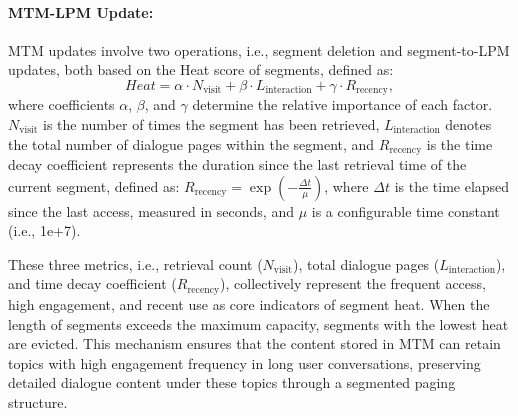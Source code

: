 \documentclass[11pt]{article}
\begin{document}


\paragraph{MTM-LPM Update:}
MTM updates involve two operations, i.e., segment deletion and segment-to-LPM updates, both based on the Heat score of segments, defined as:
\begin{equation}
        Heat = \alpha \cdot N_{\text{visit}} + \beta \cdot L_{\text{interaction}} + \gamma \cdot R_{\text{recency}},
       \label{eq:heat_formula}
\end{equation}
where coefficients $\alpha$, $\beta$, and $\gamma$ determine the relative importance of each factor. $N_{\text{visit}}$ is the number of times the segment has been retrieved, $L_{\text{interaction}}$ denotes the total number of dialogue pages within the segment, and $R_{\text{recency}}$ is the time decay coefficient represents the duration since the last retrieval time of the current segment, defined as:
$R_{\text{recency}} = \exp \left(-\frac{\Delta t}{\mu}\right)$,
where $\Delta t$ is the time elapsed since the last access, measured in seconds, and $\mu$ is a configurable time constant (i.e., 1e+7). 
    

These three metrics, i.e., retrieval count ($N_{\text{visit}}$), total dialogue pages ($L_{\text{interaction}}$), and time decay coefficient ($R_{\text{recency}}$), collectively represent the frequent access, high engagement, and recent use as core indicators of segment heat.
When the length of segments exceeds the maximum capacity, segments with the lowest heat are evicted. This mechanism ensures that the content stored in MTM can retain topics with high engagement frequency in long user conversations, preserving detailed dialogue content under these topics through a segmented paging structure.   
\end{document}
